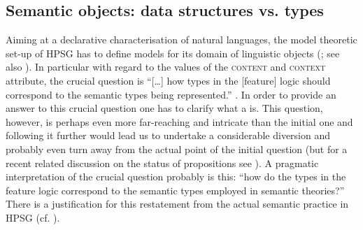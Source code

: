 \documentclass[output=paper]{langsci/langscibook}
\begin{document}
{  
\subsection{Semantic objects: data structures vs. types}
\label{sec:semantic-objects}

Aiming at a declarative characterisation of natural languages, the model theoretic set-up of HPSG has to define models for its domain of linguistic objects  (\citet[Sec.~3]{Levine:Meurers:2006}; see also ).
%
In particular with regard to the values of the \textsc{content} and \textsc{context} attribute, the crucial question is \enquote{[\ldots] how types in the [feature] logic should correspond to the semantic types being represented.}  \citep[]{Penn:2000}.
%
In order to provide an answer to this crucial question one has to clarify what a  is. 
%
This question, however, is perhaps even more far-reaching and intricate than the initial one and following it further would lead us to undertake a considerable diversion and probably even turn away from the actual point of the initial question (but for a recent related discussion on the status of propositions see \citet{King:Soames:Speaks:2014}).
%
A pragmatic interpretation of the crucial question probably is this: \enquote{how do the types in the feature logic correspond to the semantic types employed in semantic theories?}
%
There is a justification for this restatement from the actual semantic practice in HPSG (cf. ).

}
\end{document}
